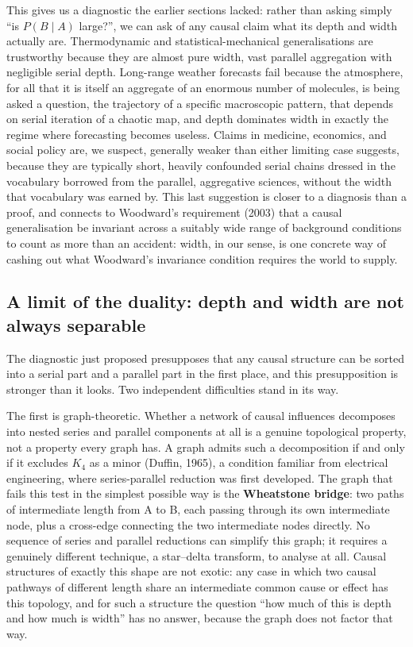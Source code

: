 \documentclass[11pt]{article}
\theoremstyle{definition}
\begin{document}
This gives us a diagnostic the earlier sections lacked: rather than asking simply ``is $P(B\mid A)$ large?'', we can ask of any causal claim what its depth and width actually are. Thermodynamic and statistical-mechanical generalisations are trustworthy because they are almost pure width, vast parallel aggregation with negligible serial depth. Long-range weather forecasts fail because the atmosphere, for all that it is itself an aggregate of an enormous number of molecules, is being asked a question, the trajectory of a specific macroscopic pattern, that depends on serial iteration of a chaotic map, and depth dominates width in exactly the regime where forecasting becomes useless. Claims in medicine, economics, and social policy are, we suspect, generally weaker than either limiting case suggests, because they are typically short, heavily confounded serial chains dressed in the vocabulary borrowed from the parallel, aggregative sciences, without the width that vocabulary was earned by. This last suggestion is closer to a diagnosis than a proof, and connects to Woodward's requirement (2003) that a causal generalisation be invariant across a suitably wide range of background conditions to count as more than an accident: width, in our sense, is one concrete way of cashing out what Woodward's invariance condition requires the world to supply.

\subsection{A limit of the duality: depth and width are not always separable}
\label{subsec:sp-limit}

The diagnostic just proposed presupposes that any causal structure can be sorted into a serial part and a parallel part in the first place, and this presupposition is stronger than it looks. Two independent difficulties stand in its way.

The first is graph-theoretic. Whether a network of causal influences decomposes into nested series and parallel components at all is a genuine topological property, not a property every graph has. A graph admits such a decomposition if and only if it excludes $K_4$ as a minor (Duffin, 1965), a condition familiar from electrical engineering, where series-parallel reduction was first developed. The graph that fails this test in the simplest possible way is the \textbf{Wheatstone bridge}: two paths of intermediate length from A to B, each passing through its own intermediate node, plus a cross-edge connecting the two intermediate nodes directly. No sequence of series and parallel reductions can simplify this graph; it requires a genuinely different technique, a star--delta transform, to analyse at all. Causal structures of exactly this shape are not exotic: any case in which two causal pathways of different length share an intermediate common cause or effect has this topology, and for such a structure the question ``how much of this is depth and how much is width'' has no answer, because the graph does not factor that way.
\end{document}
